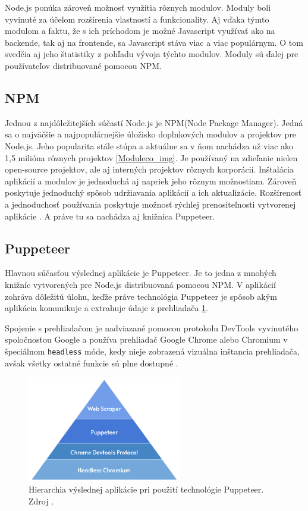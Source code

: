 \bigskip

Node.js ponúka zároveň možnosť využitia rôznych modulov. Moduly boli vyvinuté za účelom rozšírenia vlastností a funkcionality. Aj vďaka týmto modulom a faktu, že s ich príchodom je možné Javascript využívať ako na backende, tak aj na frontende, sa Javascript stáva viac a viac populárnym. O tom svedčia aj jeho štatistiky z pohľadu vývoja týchto modulov. Moduly sú ďalej pre používateľov distribuované pomocou NPM.

\subsection{NPM}

Jednou z najdôležitejších súčastí Node.js je NPM(Node Package Manager). Jedná sa o najväčšie a najpopulárnejšie úložisko doplnkových modulov a projektov pre Node.js. Jeho popularita stále stúpa a aktuálne sa v ňom nachádza už viac ako 1,5 milióna rôznych projektov \ref{Moduleco_img}. Je používaný na zdieľanie nielen open-source projektov, ale aj interných projektov rôznych korporácií. Inštalácia aplikácií a modulov je jednoduchá aj napriek jeho rôznym možnostiam. Zároveň poskytuje jednoduchý spôsob udržiavania aplikácií a ich aktualizácie. Rozšírenosť a jednoduchosť používania poskytuje možnosť rýchlej prenositeľnosti vytvorenej aplikácie \cite{npm}. A práve tu sa nachádza aj knižnica Puppeteer.

\newpage
\subsection{Puppeteer}

Hlavnou súčasťou výslednej aplikácie je Puppeteer. Je to jedna z mnohých knižníc vytvorených pre Node.js distribuovaná pomocou NPM. V aplikácií zohráva dôležitú úlohu, keďže práve technológia Puppeteer je spôsob akým aplikácia komunikuje a extrahuje údaje z prehliadača \ref{pupepyramid_img}. 

Spojenie s prehliadačom je nadviazané pomocou protokolu DevTools vyvinutého spoločnosťou Google a používa prehliadač Google Chrome alebo Chromium v špeciálnom \texttt{headless} móde, kedy nieje zobrazená vizuálna inštancia prehliadača, avšak všetky ostatné funkcie sú plne dostupné \cite{puppeteer}.  

\bigskip

\begin{figure}[hbt]
	\centering
	\includegraphics[width=0.6\textwidth]{obrazky-figures/pyramid.png}
	\caption{Hierarchia výslednej aplikácie pri použití technológie Puppeteer. Zdroj \cite{pyramid}.}
	\label{pupepyramid_img}
\end{figure}

